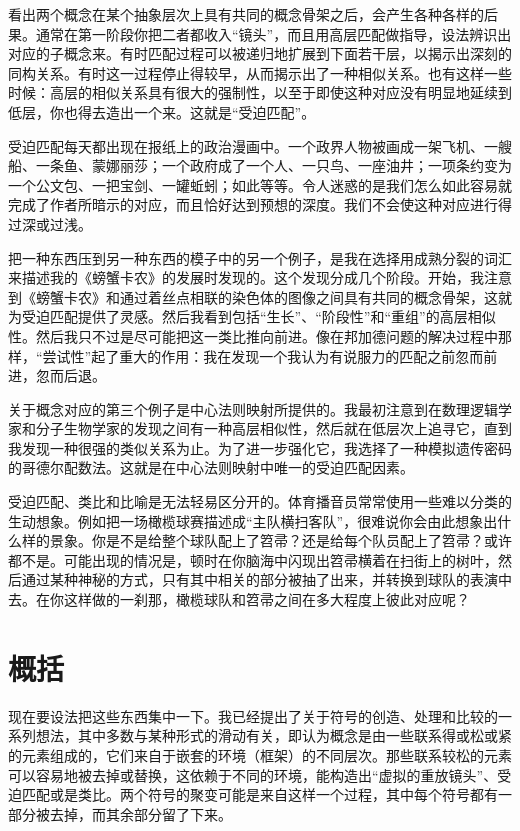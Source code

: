 看出两个概念在某个抽象层次上具有共同的概念骨架之后，会产生各种各样的后果。通常在第一阶段你把二者都收入“镜头”，而且用高层匹配做指导，设法辨识出对应的子概念来。有时匹配过程可以被递归地扩展到下面若干层，以揭示出深刻的同构关系。有时这一过程停止得较早，从而揭示出了一种相似关系。也有这样一些时候：高层的相似关系具有很大的强制性，以至于即使这种对应没有明显地延续到低层，你也得去造出一个来。这就是“受迫匹配”。

受迫匹配每天都出现在报纸上的政治漫画中。一个政界人物被画成一架飞机、一艘船、一条鱼、蒙娜丽莎；一个政府成了一个人、一只鸟、一座油井；一项条约变为一个公文包、一把宝剑、一罐蚯蚓；如此等等。令人迷惑的是我们怎么如此容易就完成了作者所暗示的对应，而且恰好达到预想的深度。我们不会使这种对应进行得过深或过浅。

把一种东西压到另一种东西的模子中的另一个例子，是我在选择用成熟分裂的词汇来描述我的《螃蟹卡农》的发展时发现的。这个发现分成几个阶段。开始，我注意到《螃蟹卡农》和通过着丝点相联的染色体的图像之间具有共同的概念骨架，这就为受迫匹配提供了灵感。然后我看到包括“生长”、“阶段性”和“重组”的高层相似性。然后我只不过是尽可能把这一类比推向前进。像在邦加德问题的解决过程中那样，“尝试性”起了重大的作用：我在发现一个我认为有说服力的匹配之前忽而前进，忽而后退。

关于概念对应的第三个例子是中心法则映射所提供的。我最初注意到在数理逻辑学家和分子生物学家的发现之间有一种高层相似性，然后就在低层次上追寻它，直到我发现一种很强的类似关系为止。为了进一步强化它，我选择了一种模拟遗传密码的哥德尔配数法。这就是在中心法则映射中唯一的受迫匹配因素。

受迫匹配、类比和比喻是无法轻易区分开的。体育播音员常常使用一些难以分类的生动想象。例如把一场橄榄球赛描述成“主队横扫客队”，很难说你会由此想象出什么样的景象。你是不是给整个球队配上了笤帚？还是给每个队员配上了笤帚？或许都不是。可能出现的情况是，顿时在你脑海中闪现出笤帚横着在扫街上的树叶，然后通过某种神秘的方式，只有其中相关的部分被抽了出来，并转换到球队的表演中去。在你这样做的一刹那，橄榄球队和笤帚之间在多大程度上彼此对应呢？

\section{概括}

现在要设法把这些东西集中一下。我已经提出了关于符号的创造、处理和比较的一系列想法，其中多数与某种形式的滑动有关，即认为概念是由一些联系得或松或紧的元素组成的，它们来自于嵌套的环境（框架）的不同层次。那些联系较松的元素可以容易地被去掉或替换，这依赖于不同的环境，能构造出“虚拟的重放镜头”、受迫匹配或是类比。两个符号的聚变可能是来自这样一个过程，其中每个符号都有一部分被去掉，而其余部分留了下来。

